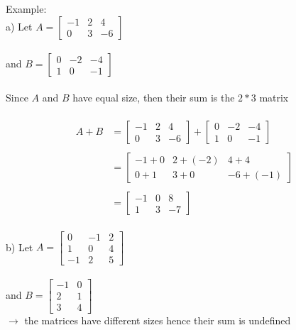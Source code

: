 \documentclass{jhwhw}
\begin{document}
Example:
\\
a) Let \(A = \begin{bmatrix} -1 & 2 & 4 \\ 0 & 3 & -6 \end{bmatrix}\)\\ \\
and \(B = \begin{bmatrix} 0 & -2 & -4 \\ 1 & 0 & -1 \end{bmatrix}\)\\ \\
Since \(A\) and \(B\) have equal size, then their sum is the \(2*3\) matrix\\ \\
\begin{align*} A + B &= \begin{bmatrix} -1 & 2 & 4 \\ 0 & 3 & -6 \end{bmatrix} + \begin{bmatrix} 0 & -2 & -4 \\ 1 & 0 & -1 \end{bmatrix}\\ \\
&= \begin{bmatrix} -1 + 0 & 2+(-2) & 4+4 \\ 0+1 & 3+0 & -6+(-1) \end{bmatrix}\\ \\
&= \begin{bmatrix} -1 & 0 & 8 \\ 1 & 3 & -7 \end{bmatrix}
\end{align*}
\\

b) Let \(A = \begin{bmatrix}  0 & -1 & 2  \\ 1 & 0 & 4 \\ -1 & 2 & 5 \end{bmatrix}\) \\ \\
and \(B = \begin{bmatrix}  -1 & 0 \\  2 & 1 \\ 3 & 4 \end{bmatrix}\)\\

\(\rightarrow\) the matrices have different sizes hence their sum is undefined\\
\end{document}
